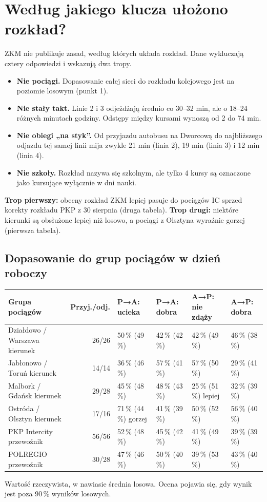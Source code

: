 \documentclass[10pt,a4paper]{article}
\newcommand{\mut}[1]{\textcolor{muted}{#1}}
\begin{document}
\section{Według jakiego klucza ułożono rozkład?}
ZKM nie publikuje zasad, według których układa rozkład. Dane wykluczają cztery odpowiedzi i wskazują dwa tropy.
\begin{itemize}
\item \textbf{Nie pociągi.} Dopasowanie całej sieci do rozkładu kolejowego jest na poziomie losowym (punkt 1).
\item \textbf{Nie stały takt.} Linie 2 i 3 odjeżdżają średnio co 30--32 min, ale o 18--24 różnych minutach godziny. Odstępy między kursami wynoszą od 2 do 74 min.
\item \textbf{Nie obiegi „na styk”.} Od przyjazdu autobusu na Dworcową do najbliższego odjazdu tej samej linii mija zwykle 21 min (linia 2), 19 min (linia 3) i 12 min (linia 4).
\item \textbf{Nie szkoły.} Rozkład nazywa się szkolnym, ale tylko 4 kursy są oznaczone jako kursujące wyłącznie w dni nauki.
\end{itemize}
\textbf{Trop pierwszy:} obecny rozkład ZKM lepiej pasuje do pociągów IC sprzed korekty rozkładu PKP z 30 sierpnia (druga tabela). \textbf{Trop drugi:} niektóre kierunki są obsłużone lepiej niż losowo, a pociągi z Olsztyna wyraźnie gorzej (pierwsza tabela).

\subsection*{Dopasowanie do grup pociągów w dzień roboczy}
{\footnotesize
\begin{center}\begin{tabular}{@{}p{3.6cm} r l l l l@{}}\toprule
Grupa pociągów & Przyj./odj. & P→A: ucieka & P→A: dobra & A→P: nie zdąży & A→P: dobra \\ \midrule
Działdowo / Warszawa \mut{kierunek} & 26/26 & 50\,\% \mut{(49\,\%)} & 42\,\% \mut{(42\,\%)} & 42\,\% \mut{(49\,\%)} & 46\,\% \mut{(38\,\%)} \\
Jabłonowo / Toruń \mut{kierunek} & 14/14 & 36\,\% \mut{(46\,\%)} & 57\,\% \mut{(41\,\%)} & 57\,\% \mut{(50\,\%)} & 29\,\% \mut{(41\,\%)} \\
Malbork / Gdańsk \mut{kierunek} & 29/28 & 45\,\% \mut{(48\,\%)} & 48\,\% \mut{(43\,\%)} & 25\,\% \mut{(51\,\%)} \textcolor{good}{lepiej} & 32\,\% \mut{(39\,\%)} \\
Ostróda / Olsztyn \mut{kierunek} & 17/16 & 71\,\% \mut{(44\,\%)} \textcolor{bad}{gorzej} & 41\,\% \mut{(39\,\%)} & 50\,\% \mut{(52\,\%)} & 56\,\% \mut{(40\,\%)} \\
PKP Intercity \mut{przewoźnik} & 56/56 & 52\,\% \mut{(48\,\%)} & 45\,\% \mut{(42\,\%)} & 41\,\% \mut{(49\,\%)} & 39\,\% \mut{(39\,\%)} \\
POLREGIO \mut{przewoźnik} & 30/28 & 47\,\% \mut{(46\,\%)} & 50\,\% \mut{(40\,\%)} & 39\,\% \mut{(53\,\%)} & 43\,\% \mut{(40\,\%)} \\
\bottomrule\end{tabular}\end{center}}
\mut{\footnotesize Wartość rzeczywista, w nawiasie średnia losowa. Ocena pojawia się, gdy wynik jest poza 90\,\% wyników losowych.}
\end{document}

